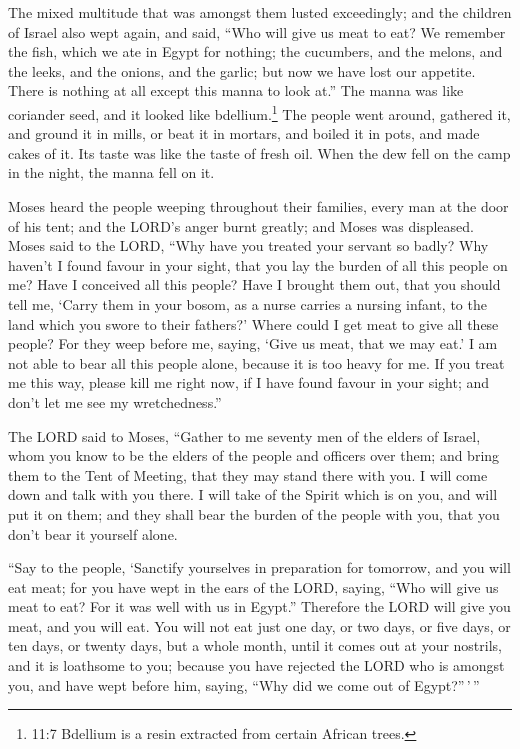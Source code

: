  The mixed multitude that was amongst them lusted
exceedingly; and the children of Israel also wept again, and said, ``Who
will give us meat to eat?  We remember the fish, which we
ate in Egypt for nothing; the cucumbers, and the melons, and the leeks,
and the onions, and the garlic;  but now we have lost our
appetite. There is nothing at all except this manna to look at.''
 The manna was like coriander seed, and it looked like
bdellium.\footnote{11:7 Bdellium is a resin extracted from certain
  African trees.}  The people went around, gathered it, and
ground it in mills, or beat it in mortars, and boiled it in pots, and
made cakes of it. Its taste was like the taste of fresh oil.
 When the dew fell on the camp in the night, the manna fell
on it.

 Moses heard the people weeping throughout their families,
every man at the door of his tent; and the LORD's anger burnt greatly;
and Moses was displeased.  Moses said to the LORD, ``Why
have you treated your servant so badly? Why haven't I found favour in
your sight, that you lay the burden of all this people on me?
 Have I conceived all this people? Have I brought them out,
that you should tell me, `Carry them in your bosom, as a nurse carries a
nursing infant, to the land which you swore to their fathers?'
 Where could I get meat to give all these people? For they
weep before me, saying, `Give us meat, that we may eat.'  I
am not able to bear all this people alone, because it is too heavy for
me.  If you treat me this way, please kill me right now, if
I have found favour in your sight; and don't let me see my
wretchedness.''

 The LORD said to Moses, ``Gather to me seventy men of the
elders of Israel, whom you know to be the elders of the people and
officers over them; and bring them to the Tent of Meeting, that they may
stand there with you.  I will come down and talk with you
there. I will take of the Spirit which is on you, and will put it on
them; and they shall bear the burden of the people with you, that you
don't bear it yourself alone.

 ``Say to the people, `Sanctify yourselves in preparation
for tomorrow, and you will eat meat; for you have wept in the ears of
the LORD, saying, ``Who will give us meat to eat? For it was well with
us in Egypt.'' Therefore the LORD will give you meat, and you will eat.
 You will not eat just one day, or two days, or five days,
or ten days, or twenty days,  but a whole month, until it
comes out at your nostrils, and it is loathsome to you; because you have
rejected the LORD who is amongst you, and have wept before him, saying,
``Why did we come out of Egypt?''\,'\,''

